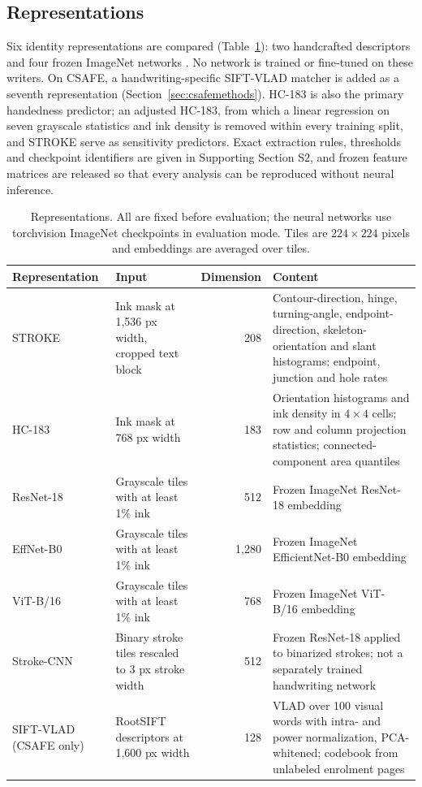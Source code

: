 \subsection{Representations}
Six identity representations are compared (Table~\ref{tab:representations}): two handcrafted descriptors and four frozen ImageNet networks \cite{he2016resnet,tan2019efficientnet,dosovitskiy2021vit}. No network is trained or fine-tuned on these writers. On CSAFE, a handwriting-specific SIFT-VLAD matcher is added as a seventh representation (Section~\ref{sec:csafemethods}). HC-183 is also the primary handedness predictor; an adjusted HC-183, from which a linear regression on seven grayscale statistics and ink density is removed within every training split, and STROKE serve as sensitivity predictors. Exact extraction rules, thresholds and checkpoint identifiers are given in Supporting Section S2, and frozen feature matrices are released so that every analysis can be reproduced without neural inference.

\begin{table}[!t]
\caption{Representations. All are fixed before evaluation; the neural networks use torchvision ImageNet checkpoints in evaluation mode. Tiles are $224\times224$ pixels and embeddings are averaged over tiles.}\label{tab:representations}
\centering
\begin{tabularx}{\textwidth}{@{}>{\raggedright\arraybackslash}p{}>{\raggedright\arraybackslash}p{}r>{\raggedright\arraybackslash}X@{}}\toprule
Representation & Input & Dimension & Content\\\midrule
STROKE & Ink mask at 1,536 px width, cropped text block & 208 & Contour-direction, hinge, turning-angle, endpoint-direction, skeleton-orientation and slant histograms; endpoint, junction and hole rates\\
HC-183 & Ink mask at 768 px width & 183 & Orientation histograms and ink density in $4\times4$ cells; row and column projection statistics; connected-component area quantiles\\
ResNet-18 & Grayscale tiles with at least 1\% ink & 512 & Frozen ImageNet ResNet-18 embedding\\
EffNet-B0 & Grayscale tiles with at least 1\% ink & 1,280 & Frozen ImageNet EfficientNet-B0 embedding\\
ViT-B/16 & Grayscale tiles with at least 1\% ink & 768 & Frozen ImageNet ViT-B/16 embedding\\
Stroke-CNN & Binary stroke tiles rescaled to 3 px stroke width & 512 & Frozen ResNet-18 applied to binarized strokes; not a separately trained handwriting network\\
SIFT-VLAD (CSAFE only) & RootSIFT descriptors at 1,600 px width & 128 & VLAD over 100 visual words with intra- and power normalization, PCA-whitened; codebook from unlabeled enrolment pages\\\bottomrule
\end{tabularx}
\end{table}

